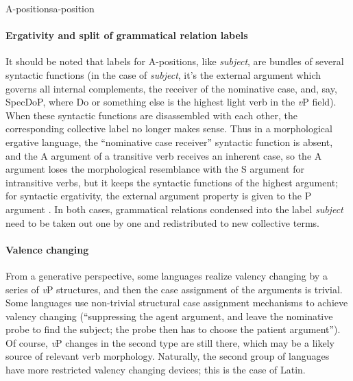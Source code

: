 \documentclass[a4paper, oneside]{report}
\newcommand*{\term}[1]{\emph{#1}}
\newcommand{\vP}{\textit{v}P}
\begin{document}
\begin{theorybox}{A-positions}{a-position}
    \paragraph*{Ergativity and split of grammatical relation labels}
    It should be noted that labels for A-positions, like \term{subject},
    are bundles of several syntactic functions
    (in the case of \term{subject}, 
    it's the external argument which governs all internal complements, 
    the receiver of the nominative case, and, say, SpecDoP, 
    where Do or something else is the highest light verb in the \vP{} field).
    When these syntactic functions are disassembled with each other, 
    the corresponding collective label no longer makes sense.
    Thus in a morphological ergative language, 
    the ``nominative case receiver'' syntactic function is absent, 
    and the A argument of a transitive verb receives an inherent case, 
    so the A argument loses the morphological resemblance with the 
    S argument for intransitive verbs, 
    but it keeps the syntactic functions of 
    the highest argument; 
    for syntactic ergativity, 
    the external argument property is given to the P argument \citep{aldridge2008generative}.
    In both cases, grammatical relations condensed into the label \term{subject} 
    need to be taken out one by one and redistributed to new collective terms.

    \paragraph*{Valence changing} From a generative perspective, some languages realize valency changing 
    by a series of \vP{} structures, and then the case assignment of the arguments is trivial.
    Some languages use non-trivial structural case assignment mechanisms
    to achieve valency changing 
    (``suppressing the agent argument, 
    and leave the nominative probe to find the subject;
    the probe then has to choose the patient argument'').
    Of course, \vP{} changes in the second type are still there,
    which may be a likely source of relevant verb morphology.
    Naturally, the second group of languages have more restricted valency changing devices;
    this is the case of Latin.
    

\end{theorybox}
\end{document}
